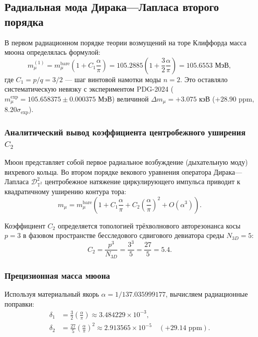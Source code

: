 \documentclass[11pt,a4paper]{article}
\theoremstyle{definition}
\theoremstyle{remark}
\begin{document}
\subsection{Радиальная мода Дирака---Лапласа второго порядка}
\label{subsec:muon_order2_resolution}

В первом радиационном порядке теории возмущений на торе Клиффорда масса мюона определялась формулой:
\begin{equation}
m_\mu^{(1)} = m_\mu^{\mathrm{bare}} \left(1 + C_1 \frac{\alpha}{\pi}\right) = 105.2885 \left(1 + \frac{3}{2} \frac{\alpha}{\pi}\right) = 105.6553 \text{ МэВ},
\end{equation}
где $C_1 = p/q = 3/2$ --- шаг винтовой намотки моды $n=2$. Это оставляло систематическую невязку с экспериментом PDG-2024 ($m_\mu^{\mathrm{exp}} = 105.658375 \pm 0.000375\text{ МэВ}$) величиной $\Delta m_\mu = +3.075\text{ кэВ}$ ($+28.90\text{ ppm}$, $8.20\sigma_{\mathrm{exp}}$).

\subsubsection{Аналитический вывод коэффициента центробежного уширения $C_2$}

Мюон представляет собой первое радиальное возбуждение (дыхательную моду) вихревого кольца. Во втором порядке векового уравнения оператора Дирака---Лапласа $\mathcal{D}_{\mathbb{T}^2}^2$ центробежное натяжение циркулирующего импульса приводит к квадратичному уширению контура тора:
\begin{equation}
m_\mu = m_\mu^{\mathrm{bare}} \left(1 + C_1 \frac{\alpha}{\pi} + C_2 \left(\frac{\alpha}{\pi}\right)^2 + O(\alpha^3)\right).
\end{equation}

Коэффициент $C_2$ определяется топологией трёхволнового авторезонанса косы $p=3$ в фазовом пространстве бесследового сдвигового девиатора среды $N_{3D} = 5$:
\begin{equation}
C_2 = \frac{p^3}{N_{3D}} = \frac{3^3}{5} = \frac{27}{5} = 5.4.
\end{equation}

\subsubsection{Прецизионная масса мюона}

Используя материальный якорь $\alpha = 1/137.035999177$, вычисляем радиационные поправки:
\begin{align}
\delta_1 &= \frac{3}{2} \left(\frac{\alpha}{\pi}\right) \approx 3.484229 \times 10^{-3}, \\
\delta_2 &= \frac{27}{5} \left(\frac{\alpha}{\pi}\right)^2 \approx 2.913565 \times 10^{-5} \quad (+29.14\text{ ppm}).
\end{align}
\end{document}
